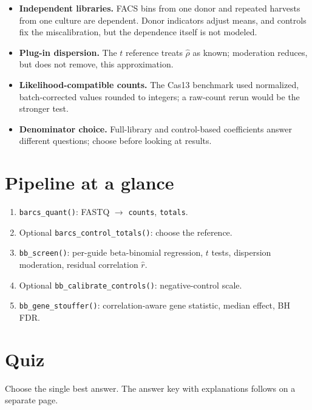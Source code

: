 \documentclass[11pt]{article}
\begin{document}
\begin{itemize}[itemsep=2pt]
\item \textbf{Independent libraries.} FACS bins from one donor and repeated
harvests from one culture are dependent.  Donor indicators adjust means, and
controls fix the miscalibration, but the dependence itself is not modeled.
\item \textbf{Plug-in dispersion.} The $t$ reference treats $\hat\rho$ as
known; moderation reduces, but does not remove, this approximation.
\item \textbf{Likelihood-compatible counts.} The Cas13 benchmark used
normalized, batch-corrected values rounded to integers; a raw-count rerun
would be the stronger test.
\item \textbf{Denominator choice.} Full-library and control-based
coefficients answer different questions; choose before looking at results.
\end{itemize}

\section{Pipeline at a glance}

\begin{enumerate}[itemsep=2pt]
\item \texttt{barcs\_quant()}: FASTQ $\rightarrow$ \texttt{counts},
\texttt{totals}.
\item Optional \texttt{barcs\_control\_totals()}: choose the reference.
\item \texttt{bb\_screen()}: per-guide beta-binomial regression, $t$ tests,
dispersion moderation, residual correlation $\hat r$.
\item Optional \texttt{bb\_calibrate\_controls()}: negative-control scale.
\item \texttt{bb\_gene\_stouffer()}: correlation-aware gene statistic,
median effect, BH FDR.
\end{enumerate}

\newpage
\section{Quiz}

Choose the single best answer.  The answer key with explanations follows on a
separate page.
\end{document}

